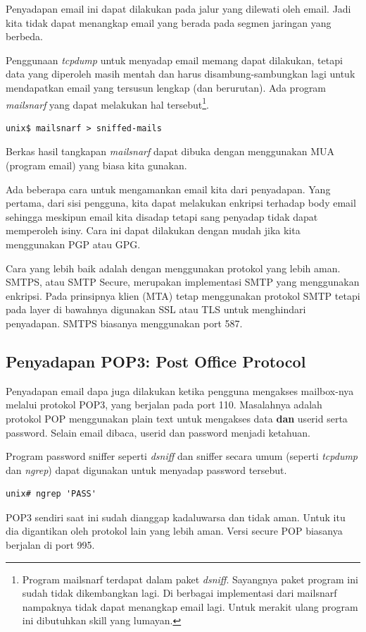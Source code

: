 Penyadapan email ini dapat dilakukan pada jalur yang dilewati oleh email. Jadi
kita tidak dapat menangkap email yang berada pada segmen jaringan yang berbeda.

Penggunaan {\em tcpdump} untuk menyadap email memang dapat dilakukan, tetapi
data yang diperoleh masih mentah dan harus disambung-sambungkan lagi untuk
mendapatkan email yang tersusun lengkap (dan berurutan). Ada program {\em
mailsnarf} yang dapat melakukan hal tersebut\footnote{Program mailsnarf
terdapat dalam paket {\em dsniff}. Sayangnya paket program ini sudah tidak
dikembangkan lagi. Di berbagai implementasi dari mailsnarf nampaknya tidak
dapat menangkap email lagi. Untuk merakit ulang program ini dibutuhkan skill
yang lumayan.}.

\begin{verbatim}
unix$ mailsnarf > sniffed-mails
\end{verbatim}

Berkas hasil tangkapan {\em mailsnarf} dapat dibuka dengan menggunakan MUA
(program email) yang biasa kita gunakan.

Ada beberapa cara untuk mengamankan email kita dari penyadapan. Yang pertama,
dari sisi pengguna, kita dapat melakukan enkripsi terhadap body email sehingga
meskipun email kita disadap tetapi sang penyadap tidak dapat memperoleh isiny.
Cara ini dapat dilakukan dengan mudah jika kita menggunakan PGP atau GPG.

Cara yang lebih baik adalah dengan menggunakan protokol yang lebih aman. SMTPS,
atau SMTP Secure, merupakan implementasi SMTP yang menggunakan enkripsi. Pada
prinsipnya klien (MTA) tetap menggunakan protokol SMTP tetapi pada layer di
bawahnya digunakan SSL atau TLS untuk menghindari penyadapan. SMTPS biasanya
menggunakan port 587.

\subsection{Penyadapan POP3: Post Office Protocol}

Penyadapan email dapa juga dilakukan ketika pengguna mengakses mailbox-nya
melalui protokol POP3, yang berjalan pada port 110. Masalahnya adalah protokol
POP menggunakan plain text untuk mengakses data {\bf dan} userid serta
password. Selain email dibaca, userid dan password menjadi ketahuan.

Program password sniffer seperti {\em dsniff} dan sniffer secara umum (seperti
{\em tcpdump} dan {\em ngrep}) dapat digunakan untuk menyadap password
tersebut.

\begin{mdframed}
\begin{verbatim}
unix# ngrep 'PASS'
\end{verbatim}
\end{mdframed}

POP3 sendiri saat ini sudah dianggap kadaluwarsa dan tidak aman. Untuk itu dia
digantikan oleh protokol lain yang lebih aman. Versi secure POP biasanya
berjalan di port 995.
